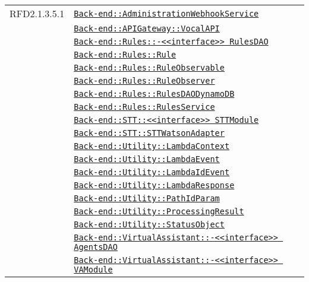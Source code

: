 \begin{longtable}{|>{\centering}m{3cm}|m{10cm}<{\centering}|}
RFD2.1.3.5.1 & \hyperref[Back-end::AdministrationWebhookService]{\texttt{Back-end::AdministrationWebhookService}}\\
& \hyperref[Back-end::APIGateway::VocalAPI]{\texttt{Back-end::APIGateway::VocalAPI}}\\
& \hyperref[Back-end::Rules::<<interface>> RulesDAO]{\texttt{Back-end::Rules::-\linebreak <<interface>> RulesDAO}}\\
& \hyperref[Back-end::Rules::Rule]{\texttt{Back-end::Rules::Rule}}\\
& \hyperref[Back-end::Rules::RuleObservable]{\texttt{Back-end::Rules::RuleObservable}}\\
& \hyperref[Back-end::Rules::RuleObserver]{\texttt{Back-end::Rules::RuleObserver}}\\
& \hyperref[Back-end::Rules::RulesDAODynamoDB]{\texttt{Back-end::Rules::RulesDAODynamoDB}}\\
& \hyperref[Back-end::Rules::RulesService]{\texttt{Back-end::Rules::RulesService}}\\
& \hyperref[Back-end::STT::<<interface>> STTModule]{\texttt{Back-end::STT::<<interface>> STTModule}}\\
& \hyperref[Back-end::STT::STTWatsonAdapter]{\texttt{Back-end::STT::STTWatsonAdapter}}\\
& \hyperref[Back-end::Utility::LambdaContext]{\texttt{Back-end::Utility::LambdaContext}}\\
& \hyperref[Back-end::Utility::LambdaEvent]{\texttt{Back-end::Utility::LambdaEvent}}\\
& \hyperref[Back-end::Utility::LambdaIdEvent]{\texttt{Back-end::Utility::LambdaIdEvent}}\\
& \hyperref[Back-end::Utility::LambdaResponse]{\texttt{Back-end::Utility::LambdaResponse}}\\
& \hyperref[Back-end::Utility::PathIdParam]{\texttt{Back-end::Utility::PathIdParam}}\\
& \hyperref[Back-end::Utility::ProcessingResult]{\texttt{Back-end::Utility::ProcessingResult}}\\
& \hyperref[Back-end::Utility::StatusObject]{\texttt{Back-end::Utility::StatusObject}}\\
& \hyperref[Back-end::VirtualAssistant::<<interface>> AgentsDAO]{\texttt{Back-end::VirtualAssistant::-\linebreak <<interface>> AgentsDAO}}\\
& \hyperref[Back-end::VirtualAssistant::<<interface>> VAModule]{\texttt{Back-end::VirtualAssistant::-\linebreak <<interface>> VAModule}}\\

\end{longtable}
